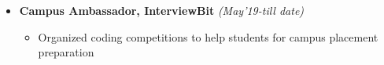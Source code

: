 \documentclass[a4paper,10pt]{article}
\begin{document}
\begin{itemize}[noitemsep,nolistsep]
        
    \item \textbf{Campus Ambassador, InterviewBit}
    \hfill\emph{(May'19-till date)}\\[-0.4cm]
        \begin{itemize}[noitemsep,nolistsep]
           \item Organized coding competitions to help students for campus placement preparation
        \end{itemize}
        
        
        
\end{itemize} 
\vspace{0.2cm}
\end{document}
